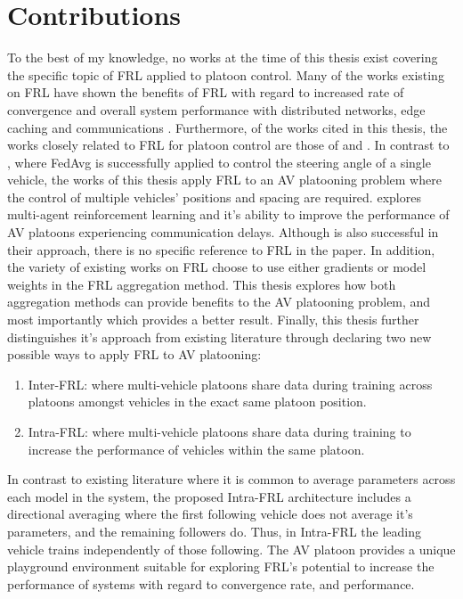 \section{Contributions}
To the best of my knowledge, no works at the time of this thesis exist covering the
specific topic of FRL applied to platoon control. Many of the works existing on FRL
have shown the benefits of FRL with regard to increased rate of convergence and overall
system performance with distributed networks, edge caching and communications
\cite{ZhangX2020, LimHyun2021, WangXiaofei2021, Huang2021}.  Furthermore, of the works
cited in this thesis, the works closely related to FRL for platoon control are those of
\cite{Peake2020} and \cite{Liang2019}.  In contrast to \cite{Liang2019}, where FedAvg
is successfully applied to control the steering angle of a single vehicle,
the works of this thesis apply FRL to an AV platooning problem where the control of multiple vehicles' positions and
spacing are required.  \cite{Peake2020} explores multi-agent reinforcement learning
and it's ability to improve the performance of AV platoons experiencing communication delays.
Although \cite{Peake2020} is also successful in their approach, there is no specific
reference to FRL in the paper. In addition, the variety of existing works on FRL
choose to use either gradients or model weights in the FRL aggregation method.
This thesis explores how both aggregation methods can provide benefits to the AV
platooning problem, and most importantly which provides a better result. Finally, this
thesis further distinguishes it's approach from existing literature through declaring two
new possible ways to apply FRL to AV platooning:

\begin{enumerate}
    \item Inter-FRL: where multi-vehicle platoons share data during training across
    platoons amongst vehicles in the exact same platoon position.
    \item Intra-FRL: where multi-vehicle platoons share data during training to increase
    the performance of vehicles within the same platoon.
\end{enumerate}

In contrast to existing literature where it is common to average parameters
across each model in the system, the proposed Intra-FRL architecture includes
a directional averaging where
the first following vehicle does not average it's parameters, and the remaining
followers do. Thus, in Intra-FRL the leading vehicle trains independently of those
following. The AV platoon provides a unique playground environment suitable for
exploring FRL's potential to increase the performance of systems with regard to
convergence rate, and performance.

